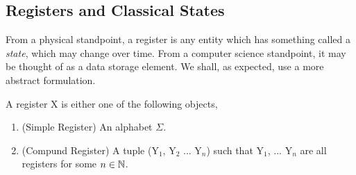 \subsection{Registers and Classical States}\label{subsec:registers}
From a physical standpoint, a register is any entity which has something called a \textit{state}, which may change over time. From a computer science standpoint, it may be thought of as a data storage element. We shall, as expected, use a more abstract formulation.
\begin{definition}[Registers]
A register \textsf{X} is either one of the following objects,
\begin{enumerate}
\item (Simple Register) An alphabet $\Sigma$.
\item (Compund Register) A tuple (\textsf{Y}$_1$, \textsf{Y}$_2$ ... \textsf{Y}$_n$) such that \textsf{Y}$_1$, ... \textsf{Y}$_n$ are all registers for some $n \in\mathbb{N}$.
\end{enumerate}
\end{definition}
